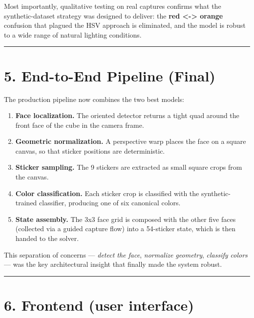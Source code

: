 \documentclass[
  11pt,
  a4paper,
]{article}
\providecommand{\tightlist}{%
  \setlength{\itemsep}{0pt}\setlength{\parskip}{0pt}}
\begin{document}
Most importantly, qualitative testing on real captures confirms what the
synthetic-dataset strategy was designed to deliver: the \textbf{red
\textless-\textgreater{} orange} confusion that plagued the HSV approach
is eliminated, and the model is robust to a wide range of natural
lighting conditions.

\begin{center}\rule{0.5\linewidth}{0.5pt}\end{center}

\section{5. End-to-End Pipeline
(Final)}\label{end-to-end-pipeline-final}

The production pipeline now combines the two best models:

\begin{enumerate}
\def\labelenumi{\arabic{enumi}.}
\tightlist
\item
  \textbf{Face localization.} The oriented detector returns a tight quad
  around the front face of the cube in the camera frame.
\item
  \textbf{Geometric normalization.} A perspective warp places the face
  on a square canvas, so that sticker positions are deterministic.
\item
  \textbf{Sticker sampling.} The 9 stickers are extracted as small
  square crops from the canvas.
\item
  \textbf{Color classification.} Each sticker crop is classified with
  the synthetic-trained classifier, producing one of six canonical
  colors.
\item
  \textbf{State assembly.} The 3x3 face grid is composed with the other
  five faces (collected via a guided capture flow) into a 54-sticker
  state, which is then handed to the solver.
\end{enumerate}

This separation of concerns --- \emph{detect the face}, \emph{normalize
geometry}, \emph{classify colors} --- was the key architectural insight
that finally made the system robust.

\begin{center}\rule{0.5\linewidth}{0.5pt}\end{center}

\section{6. Frontend (user interface)}\label{frontend}
\end{document}
